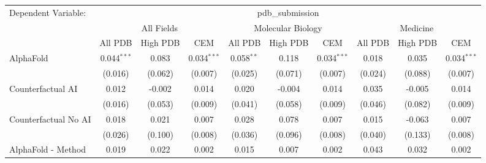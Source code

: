 \begingroup
\centering
\begin{tabular}{lccccccccc}
   \tabularnewline \midrule \midrule
   Dependent Variable: & \multicolumn{9}{c}{pdb\_submission}\\
 & \multicolumn{3}{c}{All Fields} & \multicolumn{3}{c}{Molecular Biology} & \multicolumn{3}{c}{Medicine} \\
\cmidrule(lr){2-7} \cmidrule(lr){5-10} \cmidrule(lr){8-7}
 & \multicolumn{1}{c}{All PDB} & \multicolumn{1}{c}{High PDB} & \multicolumn{1}{c}{CEM} & \multicolumn{1}{c}{All PDB} & \multicolumn{1}{c}{High PDB} & \multicolumn{1}{c}{CEM} & \multicolumn{1}{c}{All PDB} & \multicolumn{1}{c}{High PDB} & \multicolumn{1}{c}{CEM} \\
\cmidrule(lr){2-3} \cmidrule(lr){3-4} \cmidrule(lr){4-5} \cmidrule(lr){5-6} \cmidrule(lr){6-7} \cmidrule(lr){7-8} \cmidrule(lr){8-9} \cmidrule(lr){9-10} \cmidrule(lr){10-3}
   AlphaFold                                                   & 0.044$^{***}$ & 0.083         & 0.034$^{***}$ & 0.058$^{**}$  & 0.118          & 0.034$^{***}$ & 0.018         & 0.035         & 0.034$^{***}$\\   
                                                               & (0.016)       & (0.062)       & (0.007)       & (0.025)       & (0.071)        & (0.007)       & (0.024)       & (0.088)       & (0.007)\\   
   Counterfactual AI                                           & 0.012         & -0.002        & 0.014         & 0.020         & -0.004         & 0.014         & 0.035         & -0.005        & 0.014\\   
                                                               & (0.016)       & (0.053)       & (0.009)       & (0.041)       & (0.058)        & (0.009)       & (0.046)       & (0.082)       & (0.009)\\   
   Counterfactual No AI                                        & 0.018         & 0.021         & 0.007         & 0.028         & 0.078          & 0.007         & 0.015         & -0.063        & 0.007\\   
                                                               & (0.026)       & (0.100)       & (0.008)       & (0.036)       & (0.096)        & (0.008)       & (0.040)       & (0.133)       & (0.008)\\   
   AlphaFold - Method                                          & 0.019         & 0.022         & 0.002         & 0.015         & 0.007          & 0.002         & 0.043         & 0.032         & 0.002\\   

\end{tabular}
